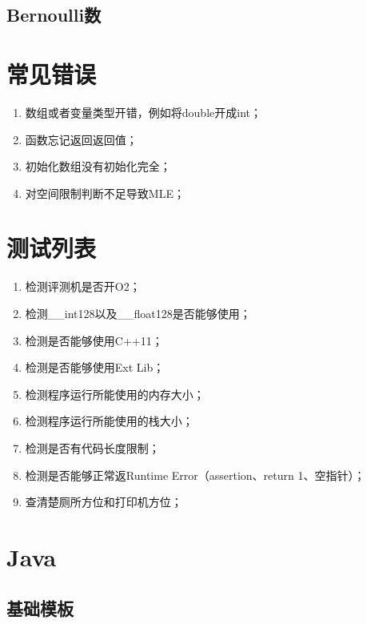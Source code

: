 \documentclass[a4paper]{article}
\begin{document}
\subsection{Bernoulli数}

\section{常见错误}

\begin{spacing}{0.6}
	\begin{enumerate}
		\item 数组或者变量类型开错，例如将double开成int；
		\item 函数忘记返回返回值；
		\item 初始化数组没有初始化完全；
		\item 对空间限制判断不足导致MLE；
	\end{enumerate}
\end{spacing}

\section{测试列表}
\begin{spacing}{0.6}
	\begin{enumerate}
		\item 检测评测机是否开O2；
		\item 检测\_\_int128以及\_\_float128是否能够使用；
		\item 检测是否能够使用C++11；
		\item 检测是否能够使用Ext Lib；
		\item 检测程序运行所能使用的内存大小；
		\item 检测程序运行所能使用的栈大小；
		\item 检测是否有代码长度限制；
		\item 检测是否能够正常返Runtime Error（assertion、return 1、空指针）；
		\item 查清楚厕所方位和打印机方位；
	\end{enumerate}
\end{spacing}

\section{Java}



\subsection{基础模板}
\end{document}
